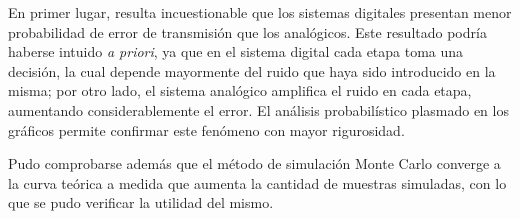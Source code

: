 \documentclass[12pt]{article}
\begin{document}
En primer lugar, resulta incuestionable que los sistemas digitales presentan menor probabilidad de error de transmisión que los analógicos. Este resultado podría haberse intuido \textit{a priori}, ya que en el sistema digital cada etapa toma una decisión, la cual depende mayormente del ruido que haya sido introducido en la misma; por otro lado, el sistema analógico amplifica el ruido en cada etapa, aumentando considerablemente el error. El análisis probabilístico plasmado en los gráficos permite confirmar este fenómeno con mayor rigurosidad.

Pudo comprobarse además que el método de simulación Monte Carlo converge a la curva teórica a medida que aumenta la cantidad de muestras simuladas, con lo que se pudo verificar la utilidad del mismo.
\end{document}
